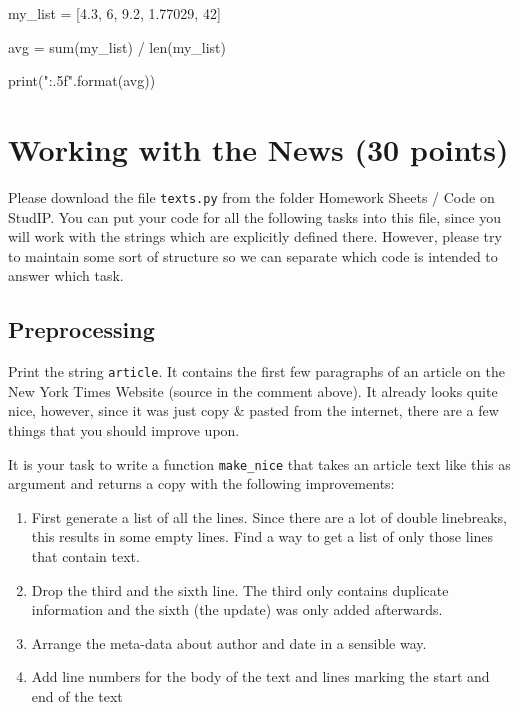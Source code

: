 \vspace{1em}

\begin{solution}

    \begin{pythoncode}

my_list = [4.3, 6, 9.2, 1.77029, 42]

avg = sum(my_list) / len(my_list)

print("{:.5f}".format(avg))

    \end{pythoncode}

\end{solution}

\section{Working with the News (30 points)}

Please download the file \texttt{texts.py} from the folder Homework Sheets / Code on StudIP. You can put your code for all the following tasks into this file, since you will work with the strings which are explicitly defined there. However, please try to maintain some sort of structure so we can separate which code is intended to answer which task. 

\subsection{Preprocessing}

Print the string \texttt{article}. It contains the first few paragraphs of an article on the New York Times Website (source in the comment above). It already looks quite nice, however, since it was just copy \& pasted from the internet, there are a few things that you should improve upon.

\vspace{1em}

\noindent It is your task to write a function \texttt{make\_nice} that takes an article text like this as argument and returns a copy with the following improvements:

\vspace{1em}

\begin{enumerate}
    
    \item First generate a list of all the lines. Since there are a lot of double linebreaks, this results in some empty lines. Find a way to get a list of only those lines that contain text.
    \item Drop the third and the sixth line. The third only contains duplicate information and the sixth (the update) was only added afterwards.
    \item Arrange the meta-data about author and date in a sensible way. 
    \item Add line numbers for the body of the text and lines marking the start and end of the text

\end{enumerate}

